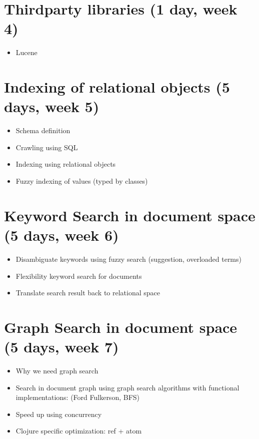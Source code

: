 \documentclass[12pt,letterpaper,oneside,notitlepage]{report}
\theoremstyle{definition}
\begin{document}
    \section{Thirdparty libraries (1 day, week 4)}
      \begin{itemize}
        \item Lucene
      \end{itemize}

    \section{Indexing of relational objects (5 days, week 5)}
      \begin{itemize}
        \item Schema definition
        \item Crawling using SQL
        \item Indexing using relational objects
        \item Fuzzy indexing of values (typed by classes)
      \end{itemize}

    \section{Keyword Search in document space (5 days, week 6)}
      \begin{itemize}
        \item Disambiguate keywords using fuzzy search (suggestion, overloaded terms)
        \item Flexibility keyword search for documents
        \item Translate search result back to relational space
      \end{itemize}

    \section{Graph Search in document space (5 days, week 7)}
      \begin{itemize}
        \item Why we need graph search
        \item Search in document graph using graph search algorithms with functional implementations: (Ford Fulkerson, BFS)
        \item Speed up using concurrency
        \item Clojure specific optimization: ref + atom
      \end{itemize}
\end{document}

